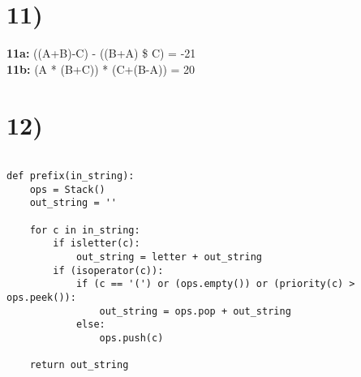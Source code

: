 \documentclass[a4paper,11pt]{article}
\begin{document}

\section*{11)}
{\bf 11a:} ((A+B)-C) - ((B+A) \$ C) = -21 \\
{\bf 11b:} (A * (B+C)) * (C+(B-A)) = 20



\section*{12)}
\begin{verbatim}

def prefix(in_string):
    ops = Stack()
    out_string = ''
    
    for c in in_string:
        if isletter(c):
            out_string = letter + out_string
        if (isoperator(c)):
            if (c == '(') or (ops.empty()) or (priority(c) > ops.peek()):
                out_string = ops.pop + out_string
            else:
                ops.push(c)
        
    return out_string
\end{verbatim}

\end{document}
